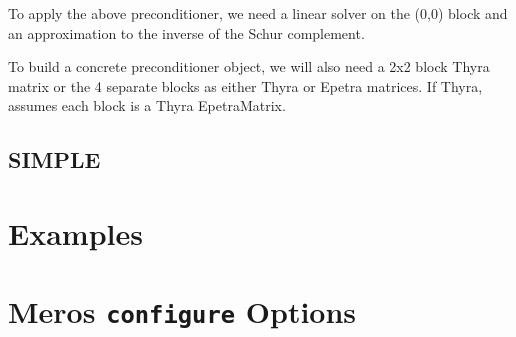 \documentclass[oneeqnum,onefignum,onetabnum,10pt]{SANDreport}
\newcommand{\InlineCommand}[1]{
  {\hspace{0.01 in}} {\tt #1} {\hspace{0.01 in}}}
\begin{document}
To apply the above preconditioner, we need a linear solver on the
(0,0) block and an approximation to the inverse of the Schur
complement.

To build a concrete preconditioner object, we will also need a 2x2
block Thyra matrix or the 4 separate blocks as either Thyra or Epetra
matrices.  If Thyra, assumes each block is a Thyra EpetraMatrix.




\subsection{SIMPLE}

\section{Examples}

\appendix

\section{Meros \InlineCommand{configure} Options}



    

\end{document}
